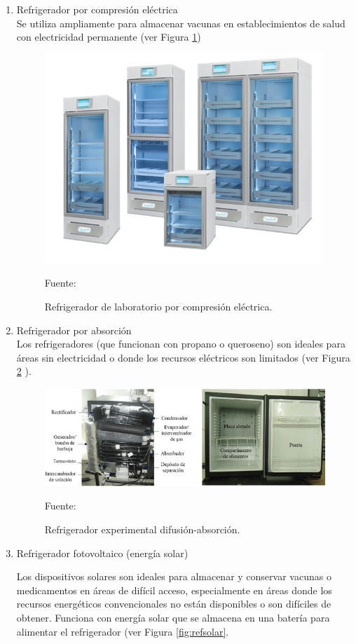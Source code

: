 \begin{enumerate}
	\item	Refrigerador por compresión eléctrica\\
	Se utiliza ampliamente para almacenar vacunas en establecimientos de salud con electricidad permanente (ver Figura \ref{fig:compresionelec})
	\begin{figure}[H]
		\centering
		\includegraphics[width=0.6\linewidth]{figures/compresionelec}
		\caption{Refrigerador de laboratorio por compresión eléctrica.}
		Fuente: \cite{refrigeradores-2013}
		\label{fig:compresionelec}
	\end{figure}
	\item Refrigerador por absorción\\
	Los refrigeradores (que funcionan con propano o queroseno) son ideales para áreas sin electricidad o donde los recursos eléctricos son limitados (ver Figura \ref{fig:refexper} ).
	
	
	\begin{figure}[H]
		\centering
		\includegraphics[width=0.6\linewidth]{figures/refexper}
		\caption{Refrigerador experimental difusión-absorción.}
		Fuente:  \cite{belamn-2015}
		\label{fig:refexper}
	\end{figure}
	
	\item Refrigerador fotovoltaico (energía solar)
	
	
	Los dispositivos solares son ideales para almacenar y conservar vacunas o medicamentos en áreas de difícil acceso, especialmente en áreas donde los recursos energéticos convencionales no están disponibles o son difíciles de obtener. Funciona con energía solar que se almacena en una batería para alimentar el refrigerador (ver Figura \ref{fig:refsolar}.
	

\end{enumerate}
